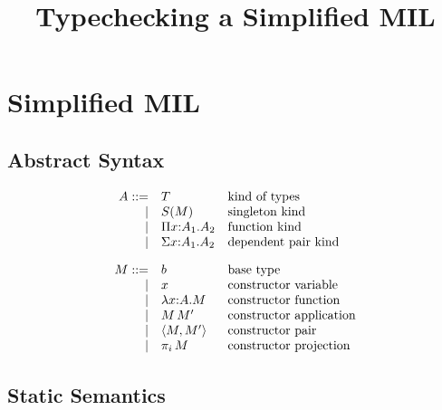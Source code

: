\documentclass[]{article}
\title{Typechecking a Simplified MIL}
\begin{document}
\maketitle

\section{Simplified MIL}

\subsection{Abstract Syntax}

\renewcommand{\ksingleton}[1]{S(#1)}
\renewcommand{\cfunction}[3]{\lambda #1{:}#2.#3}
\newcommand{\cpi}[2]{\capply{\pi_{#1}}{#2}}
\newcommand{\cpair}[2]{\langle{#1},{#2}\rangle}
\renewcommand{\kind}{A}
\renewcommand{\cvar}{x}
\renewcommand{\constructor}{M}
\renewcommand{\substitute}[2]{\{#1{\mapsto}#2\}}


\[
\begin{array}{rll}
\kind ::= &\ktype&\mbox{kind of types}\\
    |&\ksingleton{\constructor}&\mbox{singleton kind}\\
    |&\kpi{\cvar}{\kind_1}{\kind_2}&\mbox{function kind}\\
    |&\ksigma{\cvar}{\kind_1}{\kind_2}&\mbox{dependent pair kind}\\[10pt]

\constructor ::= &\basetype&\mbox{base type}\\
    |&\cvar&\mbox{constructor variable}\\
    |&\cfunction{\cvar}{\kind}{\constructor}
         &\mbox{constructor function}\\
    |&\capply{\constructor}{\constructor'}&\mbox{constructor application}\\
    |&\cpair{\constructor}{\constructor'}&\mbox{constructor pair}\\
    |&\cpi{i}{\constructor}&\mbox{constructor projection}\\
\end{array}
\]

\subsection{Static Semantics}


\infrule
  {}
  {\validcontext{\emptycontext}}
\end{document}
